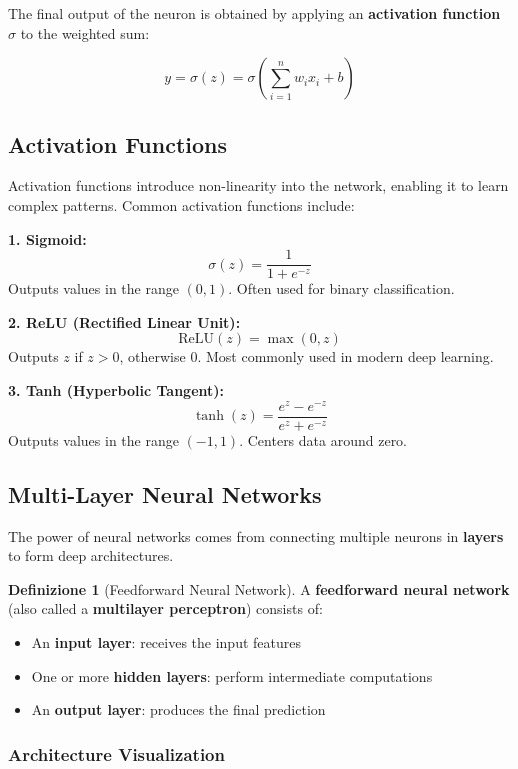 \documentclass[11pt,a4paper]{article}
\theoremstyle{definition}
\newtheorem{definition}{Definizione}[section]
\theoremstyle{plain}
\theoremstyle{remark}
\begin{document}
The final output of the neuron is obtained by applying an \textbf{activation function} $\sigma$ to the weighted sum:

\[
y = \sigma(z) = \sigma\left(\sum_{i=1}^{n} w_i x_i + b\right)
\]

\subsection{Activation Functions}

Activation functions introduce non-linearity into the network, enabling it to learn complex patterns. Common activation functions include:

\begin{tcolorbox}[colback=green!5!white,colframe=green!75!black,title=\textbf{Common Activation Functions}]
\textbf{1. Sigmoid:}
\[
\sigma(z) = \frac{1}{1 + e^{-z}}
\]
Outputs values in the range $(0, 1)$. Often used for binary classification.

\textbf{2. ReLU (Rectified Linear Unit):}
\[
\text{ReLU}(z) = \max(0, z)
\]
Outputs $z$ if $z > 0$, otherwise $0$. Most commonly used in modern deep learning.

\textbf{3. Tanh (Hyperbolic Tangent):}
\[
\tanh(z) = \frac{e^z - e^{-z}}{e^z + e^{-z}}
\]
Outputs values in the range $(-1, 1)$. Centers data around zero.
\end{tcolorbox}

\subsection{Multi-Layer Neural Networks}

The power of neural networks comes from connecting multiple neurons in \textbf{layers} to form deep architectures.

\begin{definition}[Feedforward Neural Network]
A \textbf{feedforward neural network} (also called a \textbf{multilayer perceptron}) consists of:
\begin{itemize}
    \item An \textbf{input layer}: receives the input features
    \item One or more \textbf{hidden layers}: perform intermediate computations
    \item An \textbf{output layer}: produces the final prediction
\end{itemize}
\end{definition}

\subsubsection{Architecture Visualization}
\end{document}
